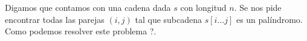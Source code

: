 Digamos que contamos con una cadena dada $s$ con longitud $n$. Se nos pide encontrar todas las parejas $(i,j)$ tal que subcadena $s[i \dots j]$ es un palíndromo. Como podemos resolver este problema ?.